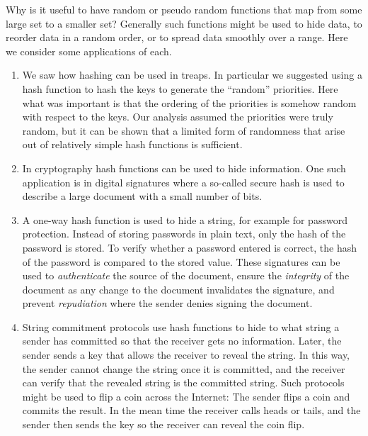 Why is it useful to have random or pseudo random functions that map
from some large set to a smaller set?  Generally such functions might
be used to hide data, to reorder data in a random order, or to spread
data smoothly over a range.
Here we consider some applications of
each.

\begin{enumerate}

\item We saw how hashing can be used in treaps.  In particular we
  suggested using a hash function to hash the keys to generate the
  ``random'' priorities.  Here what was important is that the ordering
  of the priorities is somehow random with respect to the keys.  Our
  analysis assumed the priorities were truly random, but it can be
  shown that a limited form of randomness that arise out of relatively
  simple hash functions is sufficient.

\item
  In cryptography hash functions can be used to hide information.  One
  such application is in digital signatures where a so-called secure
  hash is used to describe a large document with a small number of
  bits.

\item A one-way hash function is used to hide a string, for example
  for password protection.  Instead of storing passwords in plain
  text, only the hash of the password is stored.  To verify whether a
  password entered is correct, the hash of the password is compared to
  the stored value.  These signatures can be used to
  \emph{authenticate} the source of the document, ensure the
  \emph{integrity} of the document as any change to the document
  invalidates the signature, and prevent \emph{repudiation} where the
  sender denies signing the document.

\item String commitment protocols use hash functions to hide to what
  string a sender has committed so that the receiver gets no
  information.  Later, the sender sends a key that allows the receiver
  to reveal the string.  In this way, the sender cannot change the
  string once it is committed, and the receiver can verify that the
  revealed string is the committed string.  Such protocols might be
  used to flip a coin across the Internet: The sender flips a coin and
  commits the result. In the mean time the receiver calls heads or
  tails, and the sender then sends the key so the receiver can reveal
  the coin flip.


\end{enumerate}
